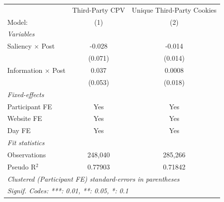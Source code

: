 \begin{tabular}{lcc}
   \tabularnewline \midrule \midrule
                              & Third-Party CPV & Unique Third-Party Cookies \\   
   Model:                     & (1)             & (2)\\  
   \midrule
   \emph{Variables}\\
   Saliency $\times$ Post     & -0.028          & -0.014\\   
                              & (0.071)         & (0.014)\\   
   Information $\times$ Post  & 0.037           & 0.0008\\   
                              & (0.053)         & (0.018)\\   
   \midrule
   \emph{Fixed-effects}\\
   Participant FE             & Yes             & Yes\\  
   Website FE                 & Yes             & Yes\\  
   Day FE                     & Yes             & Yes\\  
   \midrule
   \emph{Fit statistics}\\
   Observations               & 248,040         & 285,266\\  
   Pseudo R$^2$               & 0.77903         & 0.71842\\  
   \midrule \midrule
   \multicolumn{3}{l}{\emph{Clustered (Participant FE) standard-errors in parentheses}}\\
   \multicolumn{3}{l}{\emph{Signif. Codes: ***: 0.01, **: 0.05, *: 0.1}}\\
\end{tabular}
